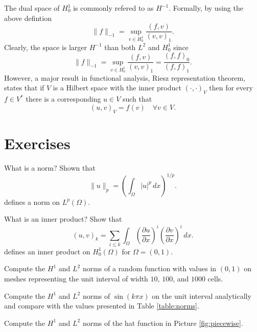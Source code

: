 The dual space of $H^1_0$ is commonly refered to as 
$H^{-1}$. Formally, by using the above defintion  
\[
\|f\|_{-1} = \sup_{v\in H^1_0} \frac{(f,v)}{(v,v)_1} .    
\]
Clearly, the space is larger $H^{-1}$ than both $L^2$ and $H^1_0$ since
\[
\|f\|_{-1} = \sup_{v\in H^1_0} \frac{(f,v)}{(v,v)_1} = \frac{(f,f)_0}{(f,f)_1} .    
\]
However, a major result in functional analysis, Riesz representation theorem, 
states that if $V$ is a Hilbert space with the inner product $(\cdot, \cdot)_V$ then 
for every $f\in V^*$ there is a corresponding $u \in V$ such that
\[
(u, v)_V = f(v) \quad \forall v \in V.   
\]






\section{Exercises}

\begin{exercise}
What is a norm? Shown that 
\[
\|u\|_p = (\int_\Omega |u|^p \, dx)^{1/p} .    
\]
defines a norm on $L^p(\Omega)$. 

\end{exercise}

\begin{exercise}
What is an inner product? 
Show that 
\[
	(u, v)_{k} = \sum_{i \le k} \int_\Omega (\frac{\partial u}{\partial x})^i (\frac{\partial v}{\partial x})^i \,  dx.    
\]
defines an inner product on $H^1_0 (\Omega)$ for $\Omega=(0,1)$.   

\end{exercise}

\begin{exercise}
Compute the $H^1$ and $L^2$ norms of a random function with values
in $(0,1)$ on meshes representing the unit interval of width $10$, $100$, and $1000$ cells.   
\end{exercise}

\begin{exercise}
Compute the $H^1$ and $L^2$ norms of  $\sin( k \pi x)$ on the unit interval analytically 
and compare with the values presented in Table \ref{table:norms}.   
\end{exercise}

\begin{exercise}
\label{ex:piecewise}
Compute the $H^1$ and $L^2$ norms of  the hat function in Picture \ref{fig:piecewise}.   
\end{exercise}



